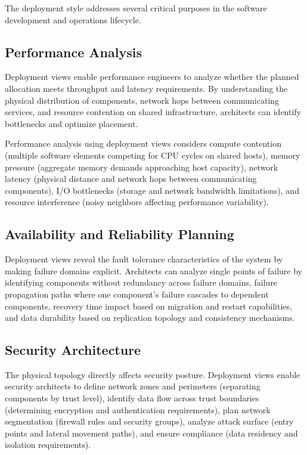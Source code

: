 \documentclass[11pt]{article}
\begin{document}
The deployment style addresses several critical purposes in the software development and operations lifecycle.

\subsection{Performance Analysis}

Deployment views enable performance engineers to analyze whether the planned allocation meets throughput and latency requirements. By understanding the physical distribution of components, network hops between communicating services, and resource contention on shared infrastructure, architects can identify bottlenecks and optimize placement.

Performance analysis using deployment views considers compute contention (multiple software elements competing for CPU cycles on shared hosts), memory pressure (aggregate memory demands approaching host capacity), network latency (physical distance and network hops between communicating components), I/O bottlenecks (storage and network bandwidth limitations), and resource interference (noisy neighbors affecting performance variability).

\subsection{Availability and Reliability Planning}

Deployment views reveal the fault tolerance characteristics of the system by making failure domains explicit. Architects can analyze single points of failure by identifying components without redundancy across failure domains, failure propagation paths where one component's failure cascades to dependent components, recovery time impact based on migration and restart capabilities, and data durability based on replication topology and consistency mechanisms.

\subsection{Security Architecture}

The physical topology directly affects security posture. Deployment views enable security architects to define network zones and perimeters (separating components by trust level), identify data flow across trust boundaries (determining encryption and authentication requirements), plan network segmentation (firewall rules and security groups), analyze attack surface (entry points and lateral movement paths), and ensure compliance (data residency and isolation requirements).
\end{document}
